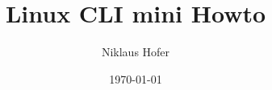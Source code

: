 \documentclass[10pt,paper=a4,final]{scrartcl}
\title{Linux CLI mini Howto}
\author{Niklaus Hofer}
\date{\today}
\begin{document}
\maketitle
\newpage
\flushleft
\tableofcontents
\newpage












\end{document}
